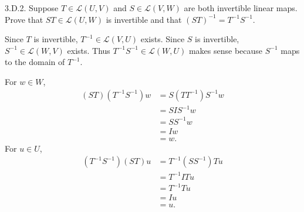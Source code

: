 \documentclass[a5paper]{article}
\begin{document}
\newcommand   \C           {\mathbf{C}}
\newcommand   \R           {\mathbf{R}}
\renewcommand \L           {\mathcal{L}}
\newcommand   \F           {\mathbf{F}}
\renewcommand \P           {\mathcal{P}}
\newcommand   \M           {\mathcal{M}}
\newcommand   \op          {\operatorname}

    3.D.2.
    Suppose $T \in \L(U,V)$ and $S \in \L(V,W)$ are both invertible linear maps.
    Prove that $ST \in \L(U,W)$ is invertible and that $(ST)^{-1} = T^{-1} S^{-1}$.

    Since $T$ is invertible, $T^{-1} \in \L(V,U)$ exists.
    Since $S$ is invertible, $S^{-1} \in \L(W,V)$ exists.
    Thus $T^{-1}S^{-1} \in \L(W,U)$ makes sense because $S^{-1}$ maps to the domain of $T^{-1}$.

    For $w \in W$,
\begin{align*}
        (ST) (T^{-1}S^{-1}) w &= S (T T^{-1}) S^{-1} w \\
                                &= S I S^{-1} w \\
                                &= S S^{-1} w \\
                                &= I w \\
                                &= w .
\end{align*}
    For $u \in U$,
\begin{align*}
        (T^{-1}S^{-1}) (ST) u &= T^{-1} (S S^{-1}) T u \\
                              &= T^{-1} I T u \\
                              &= T^{-1} T u \\
                              &= I u \\
                              &= u .
\end{align*}
\end{document}
